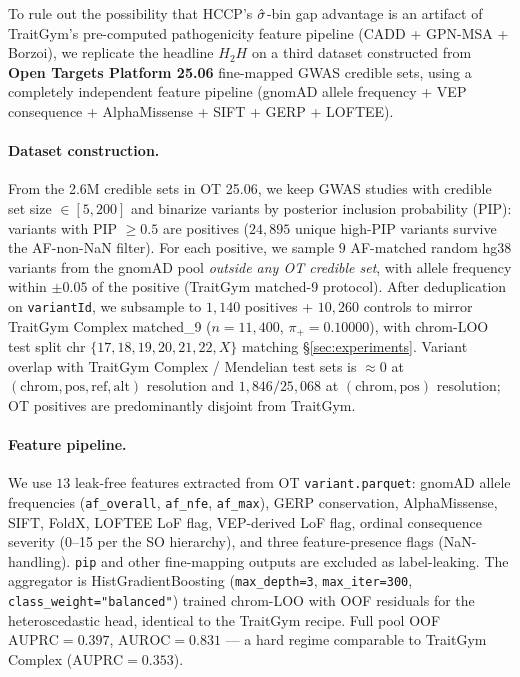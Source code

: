 
To rule out the possibility that HCCP's $\hat{\sigma}$-bin gap advantage is an
artifact of TraitGym's pre-computed pathogenicity feature pipeline (CADD +
GPN-MSA + Borzoi), we replicate the headline $H_2H$ on a third dataset
constructed from \textbf{Open Targets Platform 25.06} \citep{ochoa2023opentargets}
fine-mapped GWAS credible sets, using a completely independent feature
pipeline (gnomAD allele frequency + VEP consequence + AlphaMissense + SIFT +
GERP + LOFTEE).

\paragraph{Dataset construction.}
From the 2.6M credible sets in OT 25.06, we keep GWAS studies with credible
set size $\in [5, 200]$ and binarize variants by posterior inclusion
probability (PIP): variants with PIP $\geq 0.5$ are positives ($24{,}895$
unique high-PIP variants survive the AF-non-NaN filter). For each positive,
we sample $9$ AF-matched random hg38 variants from the gnomAD pool
\emph{outside any OT credible set}, with allele frequency within
$\pm 0.05$ of the positive (TraitGym matched-9 protocol). After
deduplication on \texttt{variantId}, we subsample to
$1{,}140$ positives + $10{,}260$ controls
to mirror TraitGym Complex matched\_9 ($n = 11{,}400$, $\pi_{+} = 0.10000$),
with chrom-LOO test split chr $\{17, 18, 19, 20, 21, 22, X\}$ matching
\S\ref{sec:experiments}. Variant overlap with TraitGym Complex / Mendelian
test sets is $\approx 0$ at $(\mathrm{chrom}, \mathrm{pos}, \mathrm{ref}, \mathrm{alt})$
resolution and $1{,}846 / 25{,}068$ at $(\mathrm{chrom}, \mathrm{pos})$
resolution; OT positives are predominantly disjoint from TraitGym.

\paragraph{Feature pipeline.}
We use $13$ leak-free features extracted from OT \texttt{variant.parquet}:
gnomAD allele frequencies (\texttt{af\_overall}, \texttt{af\_nfe}, \texttt{af\_max}),
GERP conservation, AlphaMissense, SIFT, FoldX, LOFTEE LoF flag, VEP-derived
LoF flag, ordinal consequence severity (0--15 per the SO hierarchy), and
three feature-presence flags (NaN-handling). \texttt{pip} and other
fine-mapping outputs are excluded as label-leaking. The aggregator is
HistGradientBoosting (\texttt{max\_depth=3}, \texttt{max\_iter=300},
\texttt{class\_weight="balanced"}) trained chrom-LOO with OOF residuals for
the heteroscedastic head, identical to the TraitGym recipe. Full pool OOF
$\mathrm{AUPRC} = 0.397$, $\mathrm{AUROC} = 0.831$ — a hard regime
comparable to TraitGym Complex ($\mathrm{AUPRC} = 0.353$).

